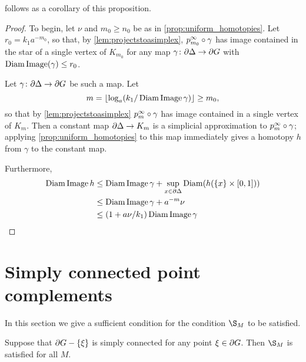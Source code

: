 \documentclass[a4paper]{article}
\begin{document}
 follows as a corollary of this proposition.

\ddagimpliesLCd*

\begin{proof}
  To begin, let $\nu$ and $m_0 \geq n_0$ be as in
  \cref{prop:uniform_homotopies}. Let $r_0 =
  k_1a^{-m_0}$, so that, by \cref{lem:projectstoasimplex},
  $p^\infty_{m_0}\circ\gamma$ has image contained in the star of a single
  vertex of $K_{m_0}$ for any map $\gamma\colon\partial\Delta\to\partial
  G$ with $\operatorname{Diam}\operatorname{Image}(\gamma)\leq r_0$.

  Let $\gamma\colon\partial\Delta\to\partial G$ be such a map. Let 
  \begin{equation*}
    m = \lfloor\log_a(k_1/\operatorname{Diam}\operatorname{Image}\gamma)\rfloor \geq m_0,
  \end{equation*}
  so that by \cref{lem:projectstoasimplex} $p^\infty_{m}\circ\gamma$ has
  image contained in a single vertex of $K_m$. Then a constant map
  $\partial\Delta \to K_m$ is a simplicial approximation to
  $p^\infty_m\circ\gamma$; applying \cref{prop:uniform_homotopies} to
  this map immediately gives a homotopy $h$ from $\gamma$ to the constant map.

  Furthermore,
  \begin{align*}
    \operatorname{Diam}\operatorname{Image} h &\leq \operatorname{Diam}\operatorname{Image}\gamma + \sup_{x \in\partial\Delta}
                                    \operatorname{Diam}(h(\{x\} \times [0,1])) \\
                  &\leq \operatorname{Diam}\operatorname{Image}\gamma + a^{-m} \nu \\
                  &\leq (1 + a\nu/k_1) \operatorname{Diam}\operatorname{Image}\gamma \qedhere
  \end{align*}
\end{proof}

\section{Simply connected point complements}

In this section we give a sufficient condition for the condition $\S_M$ to be
satisfied.

\begin{proposition}
  Suppose that $\partial G - \left\{\xi\right\}$ is simply connected for any point $\xi
  \in \partial G$. Then $\S_M$ is satisfied for all $M$.
\end{proposition}
\end{document}
